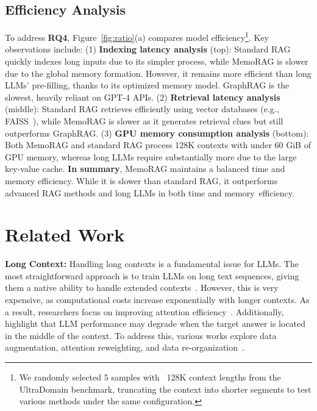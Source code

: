 \documentclass[sigconf]{acmart}
\begin{document}
\subsection{Efficiency Analysis}
To address \textbf{RQ4}, Figure~\ref{fig:ratio}(a) compares model efficiency\footnote{We randomly selected 5 samples with ~128K context lengths from the UltraDomain benchmark, truncating the context into shorter segments to test various methods under the same configuration.}. Key observations include:
(1) \textbf{Indexing latency analysis} (top): Standard RAG quickly indexes long inputs due to its simpler process, while MemoRAG is slower due to the global memory formation. However, it remains more efficient than long LLMs’ pre-filling, thanks to its optimized memory model. GraphRAG is the slowest, heavily reliant on GPT-4 APIs.
(2) \textbf{Retrieval latency analysis} (middle): Standard RAG retrieves efficiently using vector databases (e.g., FAISS~\cite{johnson2019billion}), while MemoRAG is slower as it generates retrieval clues but still outperforms GraphRAG.
(3) \textbf{GPU memory consumption analysis} (bottom): Both MemoRAG and standard RAG process 128K contexts with under 60 GiB of GPU memory, whereas long LLMs require substantially more due to the large key-value cache.
\textbf{In summary}, MemoRAG maintains a balanced time and memory efficiency. While it is slower than standard RAG, it outperforms advanced RAG methods and long LLMs in both time and memory~efficiency.











\section{Related Work}

\textbf{Long Context:} Handling long contexts is a fundamental issue for LLMs. The most straightforward approach is to train LLMs on long text sequences, giving them a native ability to handle extended contexts~\cite{abdin2024phi3,deepseekai2024deepseekv2,gpt-4,cai2024internlm2}. However, this is very expensive, as computational costs increase exponentially with longer contexts. As a result, researchers focus on improving attention efficiency~\cite{dao2022flashattention,gqa,deepseekai2024deepseekv2,jiang2023mistral}. Additionally, \citet{liu2024lost} highlight that LLM performance may degrade when the target answer is located in the middle of the context. To address this, various works explore data augmentation, attention reweighting, and data re-organization~\cite{extendingllama,glm2024chatglm,li2023long,xiong2023effective}.
\end{document}
